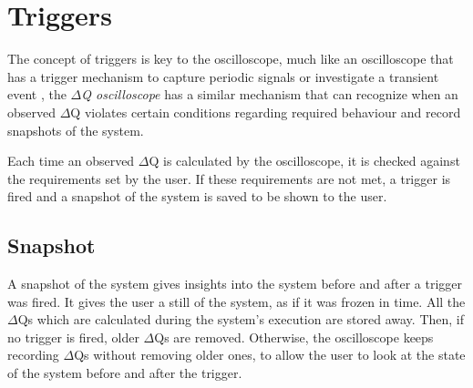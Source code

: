 \section{Triggers}
    The concept of triggers is key to the oscilloscope, much like an oscilloscope that has a trigger mechanism to capture periodic signals or investigate a transient event \cite{osc-t}, the \textit{$\Delta$Q oscilloscope} has a similar mechanism that can recognize when an observed $\Delta$Q violates certain conditions regarding required behaviour and record snapshots of the system.

    Each time an observed $\Delta$Q is calculated by the oscilloscope, it is checked against the requirements set by the user. If these requirements are not met, a trigger is fired and a snapshot of the system is saved to be shown to the user. 
    
    \subsection{Snapshot}
    A snapshot of the system gives insights into the system before and after a trigger was fired. It gives the user a still of the system, as if it was frozen in time. All the $\Delta$Qs which are calculated during the system's execution are stored away. Then, if no trigger is fired, older $\Delta$Qs are removed. Otherwise, the oscilloscope keeps recording $\Delta$Qs without removing older ones, to allow the user to look at the state of the system before and after the trigger.
    
